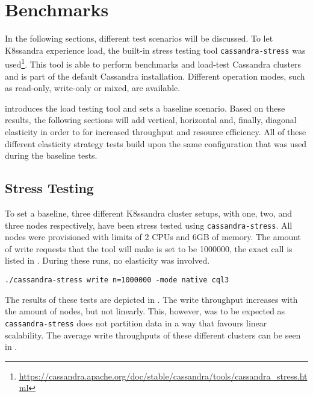 \section{Benchmarks}

In the following sections, different test scenarios will be discussed. To let K8ssandra experience load, the built-in stress testing tool \texttt{cassandra-stress} was used\footnote{\raggedright\url{https://cassandra.apache.org/doc/stable/cassandra/tools/cassandra_stress.html}}. This tool is able to perform benchmarks and load-test Cassandra clusters and is part of the default Cassandra installation. Different operation modes, such as read-only, write-only or mixed, are available.

 introduces the load testing tool and sets a baseline scenario. Based on these results, the following sections will add vertical, horizontal and, finally, diagonal elasticity in order to for increased throughput and resource efficiency. All of these different elasticity strategy tests build upon the same configuration that was used during the baseline tests.

\subsection{Stress Testing}
\label{sec:stress-testing}

To set a baseline, three different K8ssandra cluster setups, with one, two, and three nodes respectively, have been stress tested using \texttt{cassandra-stress}. All nodes were provisioned with limits of 2 CPUs and 6GB of memory. The amount of write requests that the tool will make is set to be 1000000, the exact call is listed in . During these runs, no elasticity was involved.

\begin{lstlisting}[caption={Call of the \texttt{cassandra-stress} tool that triggers 1000000 writes.},
                    captionpos=b,
                    label=lst:stress-1000000writes,
                    float]
./cassandra-stress write n=1000000 -mode native cql3
\end{lstlisting}

The results of these tests are depicted in . The write throughput increases with the amount of nodes, but not linearly. This, however, was to be expected as \texttt{cassandra-stress} does not partition data in a way that favours linear scalability. The average write throughputs of these different clusters can be seen in .

